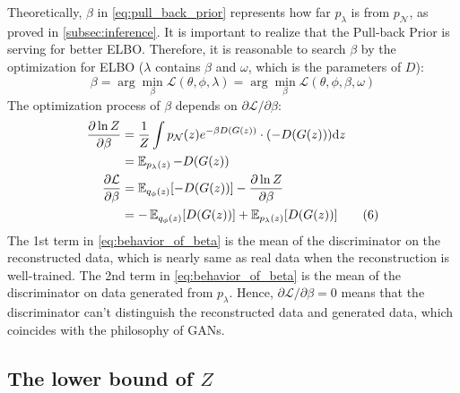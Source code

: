 Theoretically, $\beta$ in \cref{eq:pull_back_prior} represents how far $p_\lambda$ is from $p_\mathcal{N}$, as proved in \cref{subsec:inference}.
It is important to realize that the Pull-back Prior is serving for better ELBO. 
Therefore, it is reasonable to search $\beta$ by the optimization for ELBO ($\lambda$ contains $\beta$ and $\omega$, which is the parameters of $D$):
\begin{equation}
	\beta = \arg \min_{\beta} \mathcal{L}(\theta, \phi, \lambda) = \arg \min_{\beta} \mathcal{L}(\theta, \phi, \beta, \omega) \tag{5}
\end{equation}
The optimization process of $\beta$ depends on $\partial \mathcal{L}/\partial \beta$:
\begin{align*}\label{eq:behavior_of_beta}
\frac{\partial \ln Z}{\partial \beta} &= \frac{1}{Z} \int p_\mathcal{N}(z) e^{-\beta D(G(z))} \cdot (-D(G(z))) \mathrm{d} z \\
&=  \operatorname{\mathbb{E}}_{p_\lambda(z)} - D(G(z))  \\
\frac{\partial \mathcal{L}}{\partial \beta} &= \operatorname{\mathbb{E}}_{q_\phi(z)}[ -D(G(z))] - \frac{\partial \ln Z}{\partial \beta} \\
&= - \operatorname{\mathbb{E}}_{q_\phi(z)}[ D(G(z))] + \operatorname{\mathbb{E}}_{p_\lambda(z)}[ D(G(z))]   \tag{6}
\end{align*}
The 1st term in \cref{eq:behavior_of_beta} is the mean of the discriminator on the reconstructed data, which is nearly same as real data when the reconstruction is well-trained. The 2nd term in \cref{eq:behavior_of_beta} is the mean of the discriminator on data generated from $p_\lambda$. Hence, $\partial \mathcal{L}/\partial \beta = 0$ means that the discriminator can't distinguish the reconstructed data and generated data, which coincides with the philosophy of GANs.

\subsection{The lower bound of $Z$}\label{subsec:determine_z}

